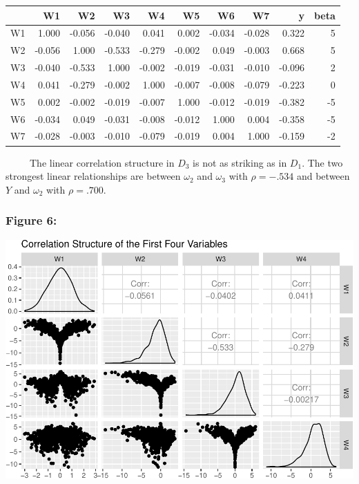 \documentclass[12pt,twoside]{reedthesis}
\begin{document}
  \begin{tabular}{l|r|r|r|r|r|r|r|r|r}
  \hline
    & W1 & W2 & W3 & W4 & W5 & W6 & W7 & y & beta\\
  \hline
  W1 & 1.000 & -0.056 & -0.040 & 0.041 & 0.002 & -0.034 & -0.028 & 0.322 & 5\\
  \hline
  W2 & -0.056 & 1.000 & -0.533 & -0.279 & -0.002 & 0.049 & -0.003 & 0.668 & 5\\
  \hline
  W3 & -0.040 & -0.533 & 1.000 & -0.002 & -0.019 & -0.031 & -0.010 & -0.096 & 2\\
  \hline
  W4 & 0.041 & -0.279 & -0.002 & 1.000 & -0.007 & -0.008 & -0.079 & -0.223 & 0\\
  \hline
  W5 & 0.002 & -0.002 & -0.019 & -0.007 & 1.000 & -0.012 & -0.019 & -0.382 & -5\\
  \hline
  W6 & -0.034 & 0.049 & -0.031 & -0.008 & -0.012 & 1.000 & 0.004 & -0.358 & -5\\
  \hline
  W7 & -0.028 & -0.003 & -0.010 & -0.079 & -0.019 & 0.004 & 1.000 & -0.159 & -2\\
  \hline
  \end{tabular}
  
  ~~~~~The linear correlation structure in \(D_3\) is not as striking as
  in \(D_1\). The two strongest linear relationships are between
  \(\omega_2\) and \(\omega_3\) with \(\rho = -.534\) and between \(Y\)
  and \(\omega_2\) with \(\rho = .700\).
  
  \subsubsection{Figure 6:}\label{figure-6}
  
  \includegraphics{Thesis_files/figure-latex/fig6-1.pdf}
  
\end{document}
